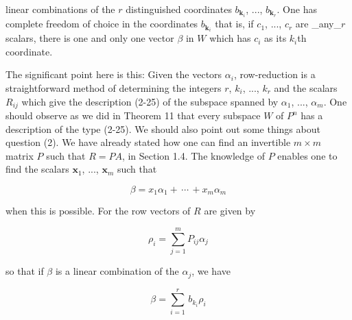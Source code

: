 linear combinations of the \(r\) distinguished coordinates \(b_{\boldsymbol{k}_{i}}\), ..., \(b_{\boldsymbol{k}_{r}}\). One has complete freedom of choice in the coordinates \(b_{\boldsymbol{k}_{i}}\) that is, if \(c_{1}\), ..., \(c_{r}\) are _any_\(r\) scalars, there is one and only one vector \(\beta\) in \(W\) which has \(c_{i}\) as its \(k_{i}\)th coordinate.

The significant point here is this: Given the vectors \(\alpha_{i}\), row-reduction is a straightforward method of determining the integers \(r\), \(k_{i}\), ..., \(k_{r}\) and the scalars \(R_{ij}\) which give the description (2-25) of the subspace spanned by \(\alpha_{1}\), ..., \(\alpha_{m}\). One should observe as we did in Theorem 11 that every subspace \(W\) of \(P^{n}\) has a description of the type (2-25). We should also point out some things about question (2). We have already stated how one can find an invertible \(m\times m\) matrix \(P\) such that \(R=PA\), in Section 1.4. The knowledge of \(P\) enables one to find the scalars \(\boldsymbol{x}_{1}\), ..., \(\boldsymbol{x}_{m}\) such that

\[\beta=x_{1}\alpha_{1}+\,\cdots\,+x_{m}\alpha_{m}\]

when this is possible. For the row vectors of \(R\) are given by

\[\rho_{i}=\sum_{j=1}^{m}P_{ij}\alpha_{j}\]

so that if \(\beta\) is a linear combination of the \(\alpha_{j}\), we have

\[\beta = \sum_{i=1}^{r}\,b_{k_{i}}\rho_{i}\] \ 